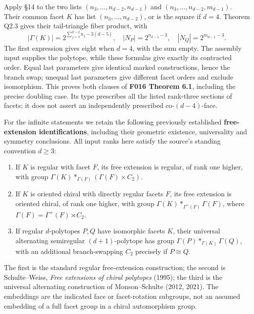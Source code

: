 \documentclass[
  10pt,
  letterpaper,
]{article}
\providecommand{\tightlist}{%
  \setlength{\itemsep}{0pt}\setlength{\parskip}{0pt}}
\begin{document}
Apply §14 to the two lists \((n_3,\ldots,n_{d-2},n_{d-1})\) and
\((n_3,\ldots,n_{d-2},m_{d-1})\). Their common facet \(K\) has list
\((n_3,\ldots,n_{d-2})\), or is the square if \(d=4\). Theorem Q2.3
gives their tail-triangle fiber product, with \[
 |\Gamma(K)|=2^{\sum_{j=3}^{d-2}n_j-3(d-5)},\quad
 |N_P|=2^{n_{d-1}-3},\quad |N_Q|=2^{m_{d-1}-3}.
\] The first expression gives eight when \(d=4\), with the sum empty.
The assembly input supplies the polytope, while these formulas give
exactly its contracted order. Equal last parameters give identical
marked constructions, hence the branch swap; unequal last parameters
give different facet orders and exclude isomorphism. This proves both
clauses of \textbf{F016 Theorem 6.1}, including the precise doubling
case. Its type prescribes all the listed rank-three sections of facets;
it does not assert an independently prescribed co-\((d-4)\)-face.

For the infinite statements we retain the following previously
established \textbf{free-extension identifications}, including their
geometric existence, universality and symmetry conclusions. All input
ranks here satisfy the source's standing convention \(d\ge3\):

\begin{enumerate}
\def\labelenumi{\arabic{enumi}.}
\tightlist
\item
  If \(K\) is regular with facet \(F\), its free extension is regular,
  of rank one higher, with group
  \(\Gamma(K)*_{\Gamma(F)}(\Gamma(F)\times C_2)\).
\item
  If \(K\) is oriented chiral with directly regular facets \(F\), its
  free extension is oriented chiral, of rank one higher, with group
  \(\Gamma(K)*_{\Gamma^+(F)}\Gamma(F)\), where
  \(\Gamma(F)=\Gamma^+(F)\rtimes C_2\).
\item
  If regular \(d\)-polytopes \(P,Q\) have isomorphic facets \(K\), their
  universal alternating semiregular \((d+1)\)-polytope has group
  \(\Gamma(P)*_{\Gamma(K)}\Gamma(Q)\), with an additional
  branch-swapping \(C_2\) precisely if \(P\cong Q\).
\end{enumerate}

The first is the standard regular free-extension construction; the
second is Schulte--Weiss, \emph{Free extensions of chiral polytopes}
(1995); the third is the universal alternating construction of
Monson--Schulte (2012, 2021). The embeddings are the indicated face or
facet-rotation subgroups, not an assumed embedding of a full facet group
in a chiral automorphism group.
\end{document}
